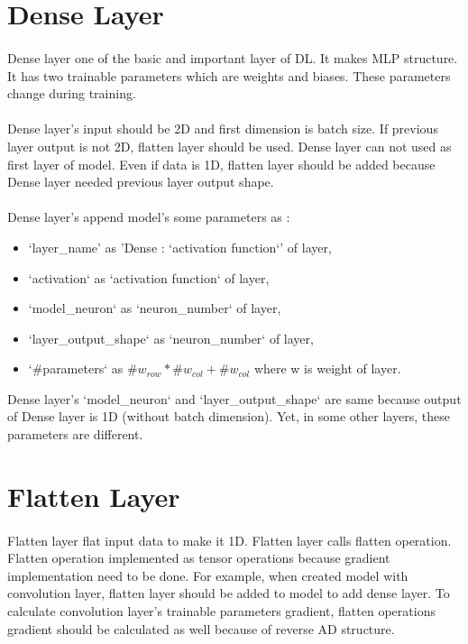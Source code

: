 \documentclass[12pt]{report}
\begin{document}
\section{Dense Layer}

\paragraph{}
Dense layer one of the basic and important layer of DL. It makes MLP structure. It has two trainable parameters which are weights and biases. These parameters change during training. 

\paragraph{}
Dense layer's input should be 2D and first dimension is batch size. If previous layer output is not 2D, flatten layer should be used. Dense layer can not used as first layer of model. Even if data is 1D, flatten layer should be added because Dense layer needed previous layer output shape. 

\paragraph{}
Dense layer's append model's some parameters as :
\begin{itemize}
	\item `layer\_name' as 'Dense : `activation function`' of layer,
	\item `activation` as `activation function` of layer,
	\item `model\_neuron` as `neuron\_number` of layer,
	\item `layer\_output\_shape` as `neuron\_number` of layer,
	\item `\#parameters` as $\#w_{row}*\#w_{col} + \#w_{col}$ where w is weight of layer.
\end{itemize}

Dense layer's `model\_neuron` and `layer\_output\_shape` are same because output of Dense layer is 1D (without batch dimension). Yet, in some other layers, these parameters are different.



\section{Flatten Layer}

\paragraph{}
Flatten layer flat input data to make it 1D. Flatten layer calls flatten operation. Flatten operation implemented as tensor operations because gradient implementation need to be done. For example, when created model with convolution layer, flatten layer should be added to model to add dense layer. To calculate convolution layer's trainable parameters gradient, flatten operations gradient should be calculated as well because of reverse AD structure. 
\end{document}
